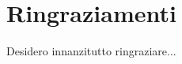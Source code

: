 \chapter{Ringraziamenti}
\setlength{\parskip}{0.8em}

Desidero innanzitutto ringraziare...

\setlength{\parskip}{0em}